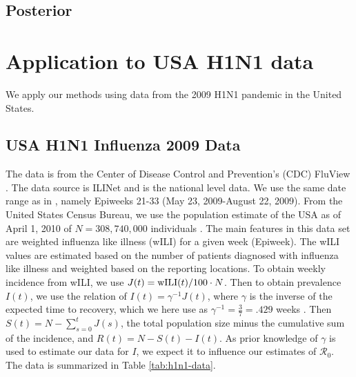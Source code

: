\documentclass[12pt]{article}
\newcommand{\rr}{\ensuremath{\mathcal{R}_0}}
\begin{document}
      \subsection{Posterior}


      \section{Application to USA H1N1 data}\label{sec:real-data}
      We apply our methods using data from the 2009 H1N1 pandemic in the United States.

      \subsection{USA H1N1 Influenza 2009 Data}
      The data is from the Center of Disease Control and Prevention's (CDC) FluView \citep{cdc-fluview}.  The data source is ILINet and is the national level data.  We use the same date range as in \cite{towers2009}, namely Epiweeks 21-33 (May 23, 2009-August 22, 2009).  From the United States Census Bureau, we use the population estimate of the USA as of April 1, 2010 of $N=308,740,000$ individuals \citep{census-2010}.  The main features in this data set are weighted influenza like illness (wILI) for a given week (Epiweek).  The wILI values are estimated based on the number of patients diagnosed with influenza like illness and weighted based on the reporting locations.  To obtain weekly incidence from wILI, we use $J(t) = \textnormal{wILI}(t) / 100 \cdot N$.  Then to obtain prevalence $I(t)$, we use the relation of $I(t) = \gamma^{-1}J(t)$, where $\gamma$ is the inverse of the expected time to recovery, which we here use as $\gamma^{-1} = \frac{3}{7}=.429$ weeks \citep{vespignani2007}.  Then $S(t) = N - \sum_{s=0}^{t}J(s)$, the total population size minus the cumulative sum of the incidence, and $R(t) = N - S(t) - I(t)$.  As prior knowledge of $\gamma$ is used to estimate our data for $I$, we expect it to influence our estimates of $\rr$.  The data is summarized in Table \ref{tab:h1n1-data}.
\end{document}
